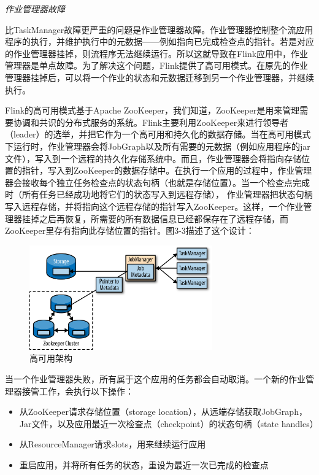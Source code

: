 \documentclass[cn,11pt,chinese]{elegantbook}
\begin{document}
\textit{作业管理器故障}

比TaskManager故障更严重的问题是作业管理器故障。作业管理器控制整个流应用程序的执行，并维护执行中的元数据——例如指向已完成检查点的指针。若是对应的作业管理器挂掉，则流程序无法继续运行。所以这就导致在Flink应用中，作业管理器是单点故障。为了解决这个问题，Flink提供了高可用模式。在原先的作业管理器挂掉后，可以将一个作业的状态和元数据迁移到另一个作业管理器，并继续执行。

Flink的高可用模式基于Apache ZooKeeper，我们知道，ZooKeeper是用来管理需要协调和共识的分布式服务的系统。Flink主要利用ZooKeeper来进行领导者（leader）的选举，并把它作为一个高可用和持久化的数据存储。当在高可用模式下运行时，作业管理器会将JobGraph以及所有需要的元数据（例如应用程序的jar文件），写入到一个远程的持久化存储系统中。而且，作业管理器会将指向存储位置的指针，写入到ZooKeeper的数据存储中。在执行一个应用的过程中，作业管理器会接收每个独立任务检查点的状态句柄（也就是存储位置）。当一个检查点完成时（所有任务已经成功地将它们的状态写入到远程存储）， 作业管理器把状态句柄写入远程存储，并将指向这个远程存储的指针写入ZooKeeper。这样，一个作业管理器挂掉之后再恢复，所需要的所有数据信息已经都保存在了远程存储，而ZooKeeper里存有指向此存储位置的指针。图3-3描述了这个设计：

\begin{figure}[htbp]
    \centering
    \includegraphics[width=0.7\textwidth]{images/spaf_0303.png}
    \caption{高可用架构}
\end{figure}

当一个作业管理器失败，所有属于这个应用的任务都会自动取消。一个新的作业管理器接管工作，会执行以下操作：

\begin{itemize}
    \item 从ZooKeeper请求存储位置（storage location），从远端存储获取JobGraph，Jar文件，以及应用最近一次检查点（checkpoint）的状态句柄（state handles）
    \item 从ResourceManager请求slots，用来继续运行应用
    \item 重启应用，并将所有任务的状态，重设为最近一次已完成的检查点
\end{itemize}
\end{document}
